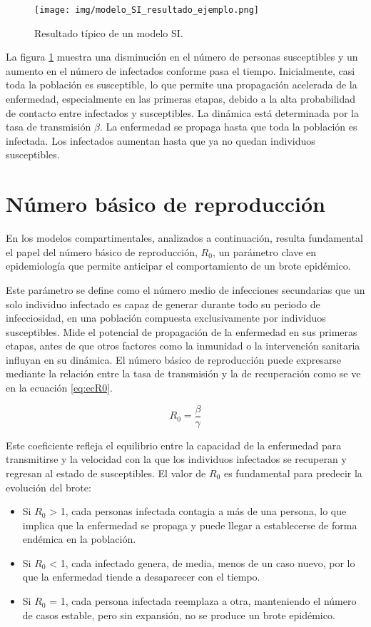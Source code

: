 \begin{figure}[H]
    \centering
    \texttt{[image: img/modelo\_SI\_resultado\_ejemplo.png]}
    \caption{Resultado típico de un modelo SI.}
    \label{fig:ejemplo SI}
    \vspace{0.5cm} %
\end{figure}

La figura \ref{fig:ejemplo SI} muestra una disminución en el número de personas susceptibles y un aumento en el número de infectados conforme pasa el tiempo. Inicialmente, casi toda la población es susceptible, lo que permite una propagación acelerada de la enfermedad, especialmente en las primeras etapas, debido a la alta probabilidad de contacto entre infectados y susceptibles.
La dinámica está determinada por la tasa de transmisión $\beta$.
La enfermedad se propaga hasta que toda la población es infectada. Los infectados aumentan hasta que ya no quedan individuos susceptibles.


\section{Número básico de reproducción}
En los modelos compartimentales, analizados a continuación, resulta fundamental el papel del número básico de reproducción, $R_0$, un parámetro clave en epidemiología que permite anticipar el comportamiento de un brote epidémico.

Este parámetro se define como el número medio de infecciones secundarias que un solo individuo infectado es capaz de generar durante todo su periodo de infecciosidad, en una población compuesta exclusivamente por individuos susceptibles. Mide el potencial de propagación de la enfermedad en sus primeras etapas, antes de que otros factores como la inmunidad o la intervención sanitaria influyan en su dinámica.
El número básico de reproducción puede expresarse mediante la relación entre la tasa de transmisión y la de recuperación como se ve en la ecuación \ref{eq:ecR0}.

\begin{equation}
R_0 = \frac{\beta}{\gamma}
\label{eq:ecR0}
\end{equation}

Este coeficiente refleja el equilibrio entre la capacidad de la enfermedad para transmitirse y la velocidad con la que los individuos infectados se recuperan y regresan al estado de susceptibles. 
El valor de $R_0$ es fundamental para predecir la evolución del brote:
\begin{itemize}
    \item Si $R_0$ > 1, cada personas infectada contagia a más de una persona, lo que implica que la enfermedad se propaga y puede llegar a establecerse de forma endémica en la población.
    \item Si $R_0$ < 1, cada infectado genera, de media, menos de un caso nuevo, por lo que la enfermedad tiende a desaparecer con el tiempo.
    \item Si $R_0$ = 1, cada persona infectada reemplaza a otra, manteniendo el número de casos estable, pero sin expansión, no se produce un brote epidémico.
\end{itemize}
	

